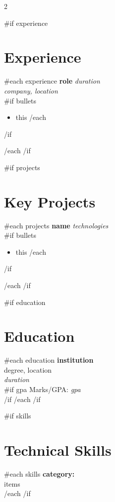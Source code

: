 \documentclass[10pt, a4paper]{article}
\begin{document}
\setlength{\columnsep}{0.03\textwidth}
\begin{paracol}{2}

{{#if experience}}
    \section*{Experience}
{{#each experience}}
    \textbf{ {{{role}}} } \hfill \textit{ {{{duration}}} }\\
    \textit{ {{{company}}}, {{{location}}} }\\[2pt]
{{#if bullets}}
    \begin{itemize}
{{#each bullets}}
        \item {{{this}}}
{{/each}}
    \end{itemize}
{{/if}}
    \vspace{8pt}

{{/each}}
{{/if}}
    
{{#if projects}}
    \section*{Key Projects}
{{#each projects}}
    \textbf{ {{{name}}} } \hfill \textit{ {{{technologies}}} }\\[2pt]
{{#if bullets}}
    \begin{itemize}
{{#each bullets}}
        \item {{{this}}}
{{/each}}
    \end{itemize}
{{/if}}
    \vspace{6pt}
    
{{/each}}
{{/if}}

\switchcolumn

{{#if education}}
    \section*{Education}
{{#each education}}
    \textbf{ {{{institution}}} }\\
    {{{degree}}}, {{{location}}}\\
    \textit{ {{{duration}}} }\\
{{#if gpa}}
    \small{Marks/GPA: \textit{ {{{gpa}}} }}\\
{{/if}}
    \vspace{4pt}
{{/each}}
{{/if}}
    
{{#if skills}}
    \section*{Technical Skills}
{{#each skills}}
    \textbf{ {{{category}}}:}\\
    {{{items}}}\\[6pt]
{{/each}}
{{/if}}

\end{paracol}
\end{document}
